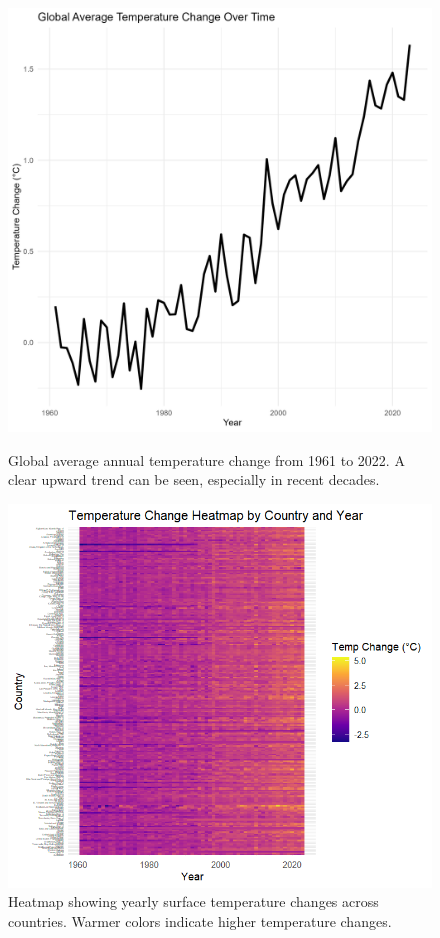 \documentclass[10pt]{article}
\begin{document}
\begin{figure}[H]
    \centering
    \begin{minipage}{0.48\textwidth}
        \centering
        \includegraphics[width=\linewidth]{TempLine.png}
        \caption{Global average annual temperature change from 1961 to 2022. A clear upward trend can be seen, especially in recent decades.}
        \label{fig:lineplot}
    \end{minipage}
    \hfill
    \begin{minipage}{0.48\textwidth}
        \centering
        \includegraphics[width=\linewidth]{GlobalHeat.png}
        \caption{Heatmap showing yearly surface temperature changes across countries. Warmer colors indicate higher temperature changes.}
        \label{fig:heatmap}
    \end{minipage}
\end{figure}
\end{document}
